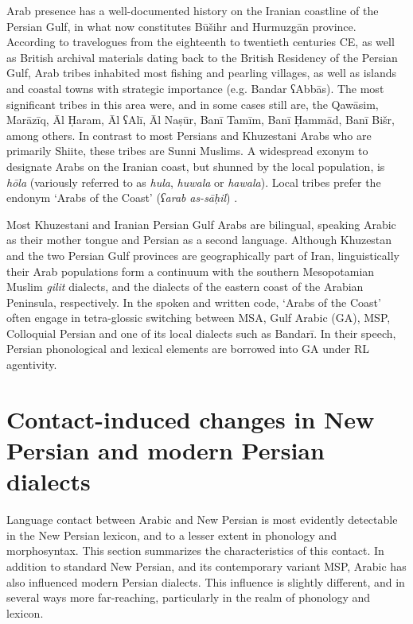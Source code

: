 \documentclass[output=paper]{langsci/langscibook}
\begin{document}
Arab presence has a well-documented history on the Iranian coastline of the Persian Gulf, in what now constitutes Būšihr and Hurmuzgān province. According to travelogues from the eighteenth to twentieth centuries CE, as well as British archival materials dating back to the British Residency of the Persian Gulf, Arab tribes inhabited most fishing and pearling villages, as well as islands and coastal towns with strategic importance (e.g. Bandar ʕAbbās). The most significant tribes in this area were, and in some cases still are, the Qawāsim, Marāzīq, Āl Ḥaram, Āl ʕAlī, Āl Naṣūr, Banī Tamīm, Banī Ḥammād, Banī Bišr, among others. In contrast to most Persians and Khuzestani Arabs who are primarily Shiite, these tribes are Sunni Muslims. A widespread exonym to designate Arabs on the Iranian coast, but shunned by the local population, is \textit{hōla} (variously referred to as \textit{hula}, \textit{huwala} or \textit{hawala}). Local tribes prefer the endonym ‘Arabs of the Coast’ (\textit{ʕarab} \textit{as-sāḥil}) \citep[110]{Gazsi2017}.

Most Khuzestani and Iranian Persian Gulf Arabs are bilingual, speaking Arabic as their mother tongue and Persian as a second language. Although Khuzestan and the two Persian Gulf provinces are geographically part of Iran, linguistically their Arab populations form a continuum with the southern Mesopotamian Muslim \textit{gilit}{} dialects, and the dialects of the eastern coast of the Arabian Peninsula, respectively. In the spoken and written code, ‘Arabs of the Coast’ often engage in tetra-glossic switching between MSA, Gulf Arabic (GA), MSP, Colloquial Persian and one of its local dialects such as Bandarī. In their speech, Persian phonological and lexical elements are borrowed into GA under RL agentivity.

\section{Contact-induced changes in New Persian and modern Persian dialects} \label{dial}
Language contact between Arabic and New Persian is most evidently detectable in the New Persian lexicon, and to a lesser extent in phonology and morphosyntax. This section summarizes the characteristics of this contact. In addition to standard New Persian, and its contemporary variant MSP, Arabic has also influenced modern Persian dialects. This influence is slightly different, and in several ways more far-reaching, particularly in the realm of phonology and lexicon.
\end{document}
